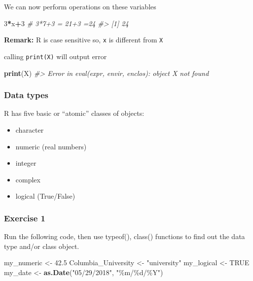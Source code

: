 \documentclass[
]{book}
\newenvironment{Shaded}{\begin{snugshade}}{\end{snugshade}}
\newcommand{\CommentTok}[1]{\textcolor[rgb]{0.56,0.35,0.01}{\textit{#1}}}
\newcommand{\ConstantTok}[1]{\textcolor[rgb]{0.56,0.35,0.01}{#1}}
\newcommand{\DecValTok}[1]{\textcolor[rgb]{0.00,0.00,0.81}{#1}}
\newcommand{\FloatTok}[1]{\textcolor[rgb]{0.00,0.00,0.81}{#1}}
\newcommand{\FunctionTok}[1]{\textcolor[rgb]{0.13,0.29,0.53}{\textbf{#1}}}
\newcommand{\NormalTok}[1]{#1}
\newcommand{\OtherTok}[1]{\textcolor[rgb]{0.56,0.35,0.01}{#1}}
\newcommand{\SpecialCharTok}[1]{\textcolor[rgb]{0.81,0.36,0.00}{\textbf{#1}}}
\newcommand{\StringTok}[1]{\textcolor[rgb]{0.31,0.60,0.02}{#1}}
\providecommand{\tightlist}{%
  \setlength{\itemsep}{0pt}\setlength{\parskip}{0pt}}
\begin{document}
We can now perform operations on these variables

\begin{Shaded}
\begin{Highlighting}[]
\DecValTok{3}\SpecialCharTok{*}\NormalTok{x}\SpecialCharTok{+}\DecValTok{3} \CommentTok{\# 3*7+3 = 21+3 =24}
\CommentTok{\#\textgreater{} [1] 24}
\end{Highlighting}
\end{Shaded}

\textbf{Remark:} R is case sensitive so, \texttt{x} is different from \texttt{X}

calling \texttt{print(X)} will output error

\begin{Shaded}
\begin{Highlighting}[]
\FunctionTok{print}\NormalTok{(X)}
\CommentTok{\#\textgreater{} Error in eval(expr, envir, enclos): object \textquotesingle{}X\textquotesingle{} not found}
\end{Highlighting}
\end{Shaded}

\subsubsection*{Data types}\label{data-types}

R has five basic or ``atomic'' classes of objects:

\begin{itemize}
\tightlist
\item
  character
\item
  numeric (real numbers)
\item
  integer
\item
  complex
\item
  logical (True/False)
\end{itemize}

\subsubsection*{Exercise 1}\label{exercise-1}

Run the following code, then use typeof(), class() functions to find out the data type and/or class object.

\begin{Shaded}
\begin{Highlighting}[]
\NormalTok{my\_numeric }\OtherTok{\textless{}{-}} \FloatTok{42.5}
\NormalTok{Columbia\_University }\OtherTok{\textless{}{-}} \StringTok{"university"}
\NormalTok{my\_logical }\OtherTok{\textless{}{-}} \ConstantTok{TRUE}
\NormalTok{my\_date }\OtherTok{\textless{}{-}} \FunctionTok{as.Date}\NormalTok{(}\StringTok{"05/29/2018"}\NormalTok{, }\StringTok{"\%m/\%d/\%Y"}\NormalTok{)}
\end{Highlighting}
\end{Shaded}
\end{document}
